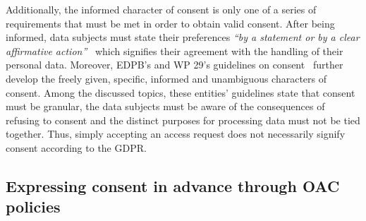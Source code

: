 

Additionally, the informed character of consent is only one of a series of requirements that must be met in order to obtain valid consent. 
After being informed, data subjects must state their preferences \textit{``by a statement or by a clear affirmative action''}~\citeyearpar{noauthor_regulation_2016} which signifies their agreement with the handling of their personal data.
Moreover, EDPB's and WP 29's guidelines on consent~\citep{european_data_protection_board_guidelines_2020,article_29_data_protection_working_party_opinion_2011,article_29_data_protection_working_party_article_2016} further develop the freely given, specific, informed and unambiguous characters of consent.
Among the discussed topics, these entities' guidelines state that consent must be granular, the data subjects must be aware of the consequences of refusing to consent and the distinct purposes for processing data must not be tied together.
Thus, simply accepting an access request does not necessarily signify consent according to the GDPR.

\subsection{Expressing consent in advance through OAC policies}
\label{sec:consent_advance}

